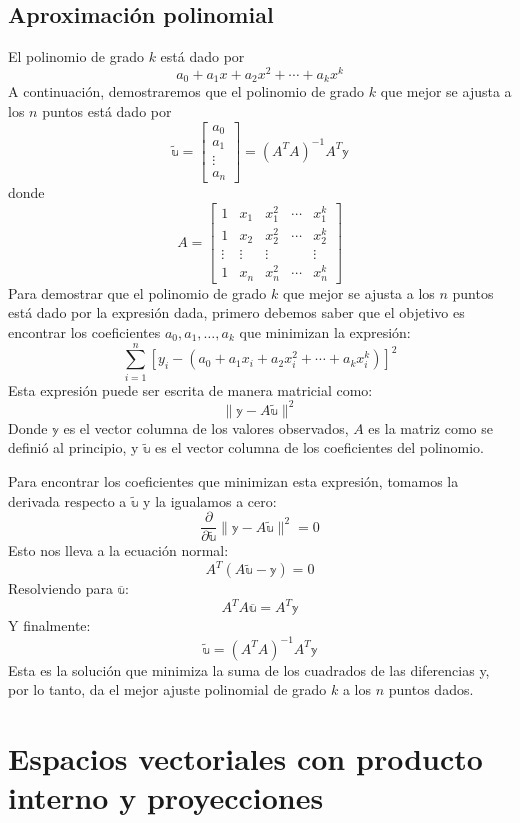 \subsection*{Aproximación polinomial}

El polinomio de grado $k$ está dado por
$$a_0 + a_1 x + a_2 x^2 + \cdots + a_k x^k$$\newpage\noindent
A continuación, demostraremos que el polinomio de grado $k$ que mejor se ajusta a los $n$ puntos está dado por 
$$\tilde{\mathbb{u}} = \begin{bmatrix} a_0 \\ a_1 \\ \vdots \\ a_n \end{bmatrix} = \left( A^T A \right)^{-1} A^T \mathbb{y}$$
donde
$$A = \begin{bmatrix}
1 & x_1 & x_1^2 & \cdots & x_1^k \\
1 & x_2 & x_2^2 & \cdots & x_2^k \\
\vdots & \vdots & \vdots & & \vdots \\
1 & x_n & x_n^2 & \cdots & x_n^k
\end{bmatrix}$$
Para demostrar que el polinomio de grado $k$ que mejor se ajusta a los $n$ puntos está dado por la expresión dada, primero debemos saber que el objetivo es encontrar los coeficientes $a_0, a_1, \dots, a_k$ que minimizan la expresión:
$$\sum_{i=1}^{n} \left[y_i - \left(a_0 + a_1 x_i + a_2 x_i^2 + \cdots + a_k x_i^k\right)\right]^2$$
Esta expresión puede ser escrita de manera matricial como:
$$\| \mathbb{y} - A\tilde{\mathbb{u}} \|^2$$
Donde \( \mathbb{y} \) es el vector columna de los valores observados, \( A \) es la matriz como se definió al principio, y \( \tilde{\mathbb{u}} \) es el vector columna de los coeficientes del polinomio.

Para encontrar los coeficientes que minimizan esta expresión, tomamos la derivada respecto a \( \tilde{\mathbb{u}} \) y la igualamos a cero:
$$\frac{\partial}{\partial \tilde{\mathbb{u}}} \| \mathbb{y} - A\tilde{\mathbb{u}} \|^2 = 0$$
Esto nos lleva a la ecuación normal:
$$A^T \left(A\tilde{\mathbb{u}} - \mathbb{y}\right) = 0$$
Resolviendo para \( \overline{\mathbb{u}} \):
$$A^T A\overline{\mathbb{u}} = A^T \mathbb{y}$$
Y finalmente:
$$\tilde{\mathbb{u}} = \left(A^T A\right)^{-1} A^T \mathbb{y}$$
Esta es la solución que minimiza la suma de los cuadrados de las diferencias y, por lo tanto, da el mejor ajuste polinomial de grado $k$ a los $n$ puntos dados.

\section{Espacios vectoriales con producto interno y proyecciones}

